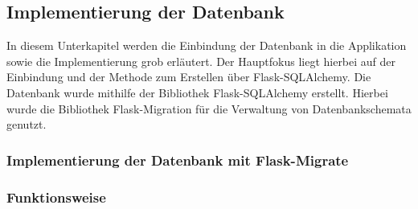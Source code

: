 \subsection{Implementierung der Datenbank}
\label{subsec:implementierung-der-datenbank}

In diesem Unterkapitel werden die Einbindung der Datenbank in die Applikation sowie die Implementierung grob erläutert.
Der Hauptfokus liegt hierbei auf der Einbindung und der Methode zum Erstellen über Flask-SQLAlchemy.
Die Datenbank wurde mithilfe der Bibliothek Flask-SQLAlchemy erstellt.
Hierbei wurde die Bibliothek Flask-Migration für die Verwaltung von Datenbankschemata genutzt.

\subsubsection{Implementierung der Datenbank mit Flask-Migrate}


\subsubsection{Funktionsweise}




